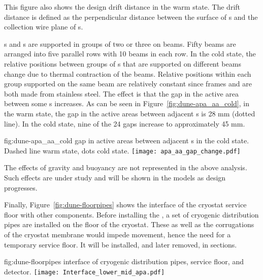 This figure %
also shows the design drift distance in
the warm state. The drift distance is defined as the perpendicular
distance between the surface of s and the collection wire
plane of s.

s and s are supported in groups of two or three
on  beams. Fifty beams are arranged into five parallel
rows with 10 beams in each row.  In the cold state, the relative
positions between groups of s that are supported on
different beams change due to thermal contraction of the
beams. Relative positions within each group %
supported on the
same beam are relatively constant since  frames and %
 are both made from stainless steel.  The effect is that the gap
in the active area between some s increases.  As can be
seen in Figure~\ref{fig:dune-apa_aa_cold}, in the warm state, the gap
in the active areas between adjacent s is 28 mm (dotted
line). In the cold state, nine of the 24 gaps increase to
approximately 45 mm.
\begin{dunefigure}{fig:dune-apa_aa_cold} 
    { gap in active areas between adjacent s in the cold state. Dashed line warm state, dots cold state.}
\texttt{[image: apa\_aa\_gap\_change.pdf]}
\end{dunefigure}

The effects of gravity and buoyancy are not represented in the above
analysis. Such effects are under study and will be shown in the models
as design progresses.

Finally, Figure~\ref{fig:dune-floorpipes} shows the interface of the
cryostat service floor with other components.  Before installing the
, a set of cryogenic distribution pipes are installed
on the floor of the cryostat. These as well as the corrugations of the
cryostat membrane would impede movement, hence the need for
a temporary service floor. It will be installed, and later removed, in sections. 
\begin{dunefigure}{fig:dune-floorpipes} 
{ interface of cryogenic distribution pipes, service floor, and
  detector.}
\texttt{[image: Interface\_lower\_mid\_apa.pdf]}
\end{dunefigure}

